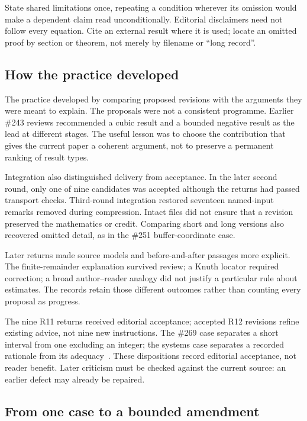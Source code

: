 State shared limitations once, repeating a condition wherever its omission
would make a dependent claim read unconditionally. Editorial disclaimers
need not follow every equation. Cite an external result where it is used;
locate an omitted proof by section or theorem, not merely by filename or
``long record''.

\subsection{How the practice developed}

The practice developed by comparing proposed revisions with the arguments
they were meant to explain. The proposals were not a consistent programme.
Earlier \#243 reviews recommended a cubic result and a bounded negative
result as the lead at different stages. The useful lesson was to choose the
contribution that gives the current paper a coherent argument, not to preserve
a permanent ranking of result types.

Integration also distinguished delivery from acceptance. In the later second
round, only one of nine candidates was accepted although the returns had
passed transport checks. Third-round integration restored seventeen named-input
remarks removed during compression. Intact files did not ensure that a
revision preserved the mathematics or credit. Comparing short and long versions
also recovered omitted detail, as in the \#251 buffer-coordinate case.

Later returns made source models and before-and-after passages more explicit.
The finite-remainder explanation survived review; a Knuth locator required
correction; a broad author--reader analogy did not justify a particular rule
about estimates. The records retain those different outcomes rather than
counting every proposal as progress.

The nine R11 returns received editorial acceptance; accepted R12 revisions
refine existing advice, not nine new instructions. The \#269 case separates a
short interval from one excluding an integer; the systems case separates a
recorded rationale from its adequacy~\cite{systems-r12}. These dispositions
record editorial acceptance, not reader benefit. Later criticism must be
checked against the current source: an earlier defect may already be repaired.

\subsection{From one case to a bounded amendment}

